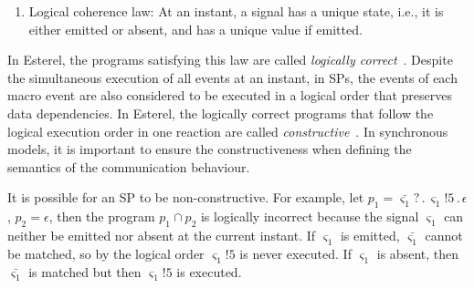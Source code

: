 \documentclass{fcs}
\newcommand{\sig}[0]{\varsigma}
\DeclareMathOperator{\para}{\cap}
\DeclareMathOperator{\nex}{.}
\begin{document}
\begin{enumerate}[]
\item Logical coherence law: At an instant, a signal has a unique state, i.e., it is either emitted or absent, and has a unique value if emitted.
\end{enumerate}

In Esterel, the programs satisfying this law are called \emph{logically correct}~\cite{Berry99}.
Despite the simultaneous execution of all events at an instant, in SPs, the events of each macro event are also considered to be executed in a logical order that preserves data dependencies.
In Esterel, the logically correct programs that follow the logical execution order in one reaction are called \emph{constructive}~\cite{Berry99}.
In synchronous models, it is important to ensure the constructiveness when defining the semantics of the communication behaviour.


It is possible for an SP to be non-constructive.
For example, let $p_1 = \bar{\sig_1}?\nex \sig_1!5\nex \epsilon$, $p_2 = \epsilon$, then the program $p_1\para p_2$ is logically incorrect because the signal $\sig_1$ can neither be emitted nor absent at the current instant.
If $\sig_1$ is emitted, $\bar{\sig_1}$ cannot be matched, so by the logical order $\sig_1!5$ is never executed.
If $\sig_1$ is absent, then $\bar{\sig_1}$ is matched but then $\sig_1!5$ is executed.
\end{document}
